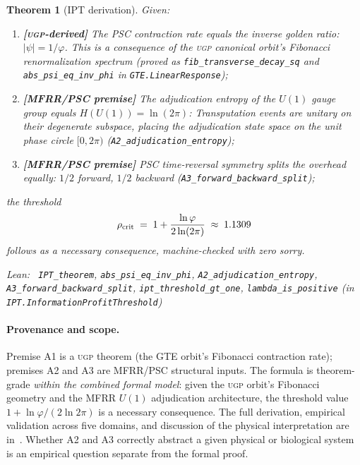 \documentclass[11pt,a4paper]{article}
\newenvironment{leanref}%
  {\par\smallskip\noindent\begingroup\raggedright\textup{Lean:}~}%
  {\par\endgroup}
\newtheorem{theorem}{Theorem}[section]
\theoremstyle{definition}
\newcommand{\ugp}{\textsc{ugp}}
\begin{document}
\begin{theorem}[IPT derivation]\label{thm:ipt-lean}
Given:
\begin{enumerate}[nosep,label=(A\arabic*)]
\item \textbf{[\ugp{}-derived]} The PSC contraction rate equals the inverse golden ratio:
  $|\psi| = 1/\varphi$.
  This is a consequence of the \ugp{} canonical orbit's Fibonacci renormalization spectrum
  (proved as \lstinline|fib_transverse_decay_sq| and \lstinline|abs_psi_eq_inv_phi|
  in \texttt{GTE.LinearResponse});
\item \textbf{[MFRR/PSC premise]} The adjudication entropy of the $U(1)$ gauge group
  equals $H(U(1)) = \ln(2\pi)$: Transputation events are unitary on their degenerate
  subspace, placing the adjudication state space on the unit phase circle $[0,2\pi)$
  (\lstinline|A2_adjudication_entropy|);
\item \textbf{[MFRR/PSC premise]} PSC time-reversal symmetry splits the overhead equally:
  $1/2$ forward, $1/2$ backward (\lstinline|A3_forward_backward_split|);
\end{enumerate}
the threshold
\[
  \rho_{\rm crit} \;=\; 1 + \frac{\ln\varphi}{2\ln(2\pi)} \;\approx\; 1.1309
\]
follows as a necessary consequence, machine-checked with zero sorry.

\begin{leanref} \lstinline|IPT_theorem|,
\lstinline|abs_psi_eq_inv_phi|,
\lstinline|A2_adjudication_entropy|,
\lstinline|A3_forward_backward_split|,
\lstinline|ipt_threshold_gt_one|, \lstinline|lambda_is_positive|
\textup{(in \texttt{IPT.InformationProfitThreshold})}
\end{leanref}
\end{theorem}

\paragraph{Provenance and scope.}
Premise A1 is a \ugp{} theorem (the GTE orbit's Fibonacci contraction rate); premises A2
and A3 are MFRR/PSC structural inputs.
The formula is theorem-grade \emph{within the combined formal model}: given the \ugp{}
orbit's Fibonacci geometry and the MFRR $U(1)$ adjudication architecture, the threshold
value $1 + \ln\varphi/(2\ln 2\pi)$ is a necessary consequence.
The full derivation, empirical validation across five domains, and discussion of the
physical interpretation are in~\cite{SpivackIPT2026}.
Whether A2 and A3 correctly abstract a given physical or biological system is an empirical
question separate from the formal proof.
\end{document}
